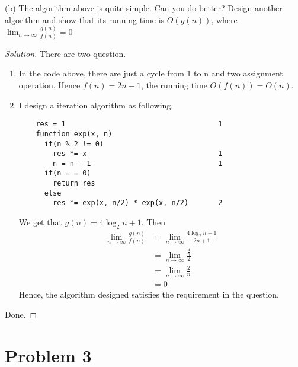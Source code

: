 \documentclass[a4paper]{article}
\newenvironment{solution}
  {\renewcommand\qedsymbol{$\blacksquare$}\begin{proof}[Solution]}
  {\end{proof}}
\begin{document}
(b) The algorithm above is quite simple. Can you do better? Design another algorithm and show that
its running time is $O(g(n))$, where $\lim_{n\to \infty}\frac{g(n)}{f(n)}=0$
\begin{solution}
  There are two question.
  \begin{enumerate}
    \item  In the code above, there are just a cycle from 1 to n and two
      assignment operation. Hence $f(n)=2n+1$, the running time $O(f(n))=O(n)$.
    \item I design a iteration algorithm as following.
    \begin{lstlisting}
    res = 1                                    1
    function exp(x, n)
      if(n % 2 != 0)
        res *= x                               1
        n = n - 1                              1
      if(n = = 0)
        return res
      else
        res *= exp(x, n/2) * exp(x, n/2)       2
    \end{lstlisting}
    We get that $g(n)=4\log_2{n}+1$. Then
    \begin{align*}
      \lim_{n\to \infty}\frac{g(n)}{f(n)}&=\lim_{n\to \infty}\frac{4\log_2{n}+1}{2n+1}\\
      &=\lim_{n\to \infty}\frac{\frac{4}{n}}{2}\\
      &=\lim_{n\to \infty}\frac{2}{n}\\
      &= 0
    \end{align*}
    Hence, the algorithm designed satisfies the requirement in the question.
  \end{enumerate}
  Done.
\end{solution}

\section*{Problem 3}
\end{document}
